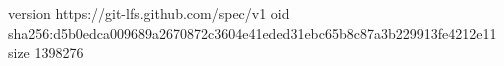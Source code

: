 version https://git-lfs.github.com/spec/v1
oid sha256:d5b0edca009689a2670872c3604e41eded31ebc65b8c87a3b229913fe4212e11
size 1398276
